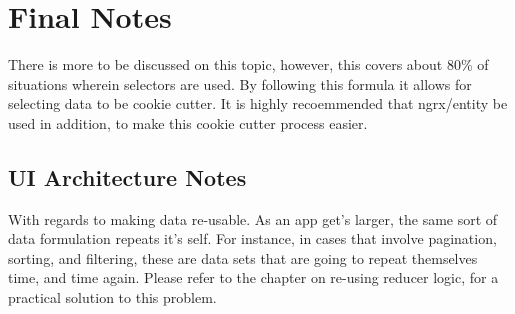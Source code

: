 \section{Final Notes}
There is more to be discussed on this topic, however, this covers about 80\% of
situations wherein selectors are used. By following this formula it allows for
selecting data to be cookie cutter. It is highly recoemmended that ngrx/entity
be used in addition, to make this cookie cutter process easier.

\subsection{UI Architecture Notes}
With regards to making data re-usable. As an app get's larger, the same sort
of data formulation repeats it's self. For instance, in cases that involve
pagination, sorting, and filtering, these are data sets that are going to
repeat themselves time, and time again. Please refer to the chapter on re-using
reducer logic, for a practical solution to this problem.
